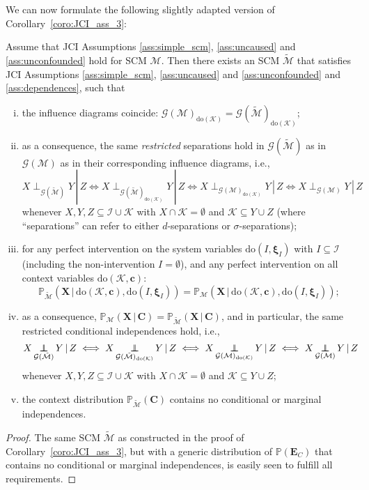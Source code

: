 \documentclass[twoside,11pt]{article}
\DeclareMathOperator*{\CI}{{\,\perp\mkern-12mu\perp\,}}
\DeclareMathOperator*{\SEP}{\perp}
\newcommand\indep[4]{{#1} \CI_{#4} {#2} \given {#3}}
\newcommand\sep[4]{{#1} \SEP_{#4} {#2} \given {#3}}
\newcommand{\Prb}{\mathbb{P}}
\newcommand\B[1]{\bm{#1}}
\newcommand\C[1]{\mathcal{#1}}
\newcommand\given{\,|\,}
\newcommand{\intervene}{\mathrm{do}}
\begin{document}
We can now formulate the following slightly adapted version of Corollary~\ref{coro:JCI_ass_3}:
\begin{corollary}\label{coro:JCI_ass_3_WLOG}
Assume that JCI Assumptions \ref{ass:simple_scm}, \ref{ass:uncaused} and \ref{ass:unconfounded} hold for SCM $\C{M}$.
Then there exists an SCM $\tilde{\C{M}}$ that satisfies JCI Assumptions \ref{ass:simple_scm}, \ref{ass:uncaused} and \ref{ass:unconfounded} and \ref{ass:dependences}, such that
  \begin{enumerate}[(i)]
    \item the influence diagrams coincide: $\C{G}(\C{M})_{\intervene(\C{K})} = \C{G}(\tilde{\C{M}})_{\intervene(\C{K})}$;
    \item as a consequence, the same \emph{restricted} separations hold in $\C{G}(\tilde{\C{M}})$ as in $\C{G}(\C{M})$ as in their corresponding influence diagrams, i.e.,
      $$\sep{X}{Y}{Z}{\C{G}(\tilde{\C{M}})} \iff \sep{X}{Y}{Z}{\C{G}(\tilde{\C{M}})_{\intervene(\C{K})}} \iff \sep{X}{Y}{Z}{\C{G}(\C{M})_{\intervene(\C{K})}} \iff \sep{X}{Y}{Z}{\C{G}(\C{M})}$$
      whenever $X,Y,Z \subseteq \C{I} \cup \C{K}$ with $X \cap \C{K} = \emptyset$ and $\C{K} \subseteq Y \cup Z$ (where ``separations'' can refer to either $d$-separations or $\sigma$-separations);
    \item for any perfect intervention on the system variables $\intervene(I,\B{\xi}_I)$ with $I \subseteq \C{I}$ (including the non-intervention $I = \emptyset$), and any perfect intervention on all context variables $\intervene(\C{K},\B{c})$:
      $$\Prb_{\tilde{\C{M}}}(\B{X} \given \intervene(\C{K},\B{c}), \intervene(I,\B{\xi}_I)) = \Prb_{\C{M}}(\B{X} \given \intervene(\C{K},\B{c}), \intervene(I,\B{\xi}_I));$$
    \item as a consequence, $\Prb_{\C{M}}(\B{X} \given \B{C}) = \Prb_{\tilde{\C{M}}}(\B{X} \given \B{C})$, and in particular, the same restricted conditional independences hold, i.e.,
      $$\indep{X}{Y}{Z}{\C{G}(\tilde{\C{M}})} \iff \indep{X}{Y}{Z}{\C{G}(\tilde{\C{M}})_{\intervene(\C{K})}} \iff \indep{X}{Y}{Z}{\C{G}(\C{M})_{\intervene(\C{K})}} \iff \indep{X}{Y}{Z}{\C{G}(\C{M})}$$
      whenever $X,Y,Z \subseteq \C{I} \cup \C{K}$ with $X \cap \C{K} = \emptyset$ and $\C{K} \subseteq Y \cup Z$;
    \item the context distribution $\Prb_{\tilde{\C{M}}}(\B{C})$ contains no conditional or marginal independences.
  \end{enumerate}
\end{corollary}
\begin{proof}
  The same SCM $\tilde{\C{M}}$ as constructed in the proof of Corollary~\ref{coro:JCI_ass_3},
  but with a generic distribution of $\Prb(\B{E}_C)$ that contains no conditional or marginal independences,
  is easily seen to fulfill all requirements.
\end{proof}
\end{document}
